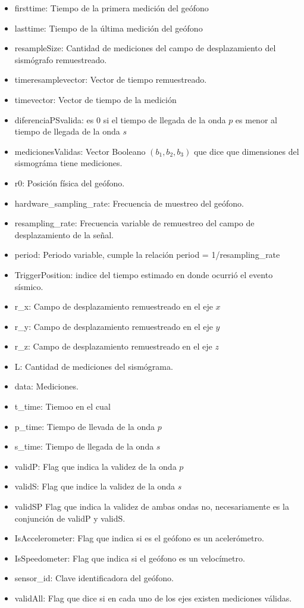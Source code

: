 \begin{itemize}
    \item firsttime: Tiempo de la primera medición del geófono
    \item lasttime: Tiempo de la última medición del geófono
    \item resampleSize: Cantidad de mediciones del campo de desplazamiento del
    sismógrafo remuestreado.
    \item timeresamplevector: Vector de tiempo remuestreado.
    \item timevector: Vector de tiempo de la medición
    \item diferenciaPSvalida: es 0 si el tiempo de llegada de la onda $p$ es
    menor al tiempo de llegada de la onda $s$
    \item medicionesValidas: Vector Booleano $(b_1,b_2,b_3)$ que dice que
    dimensiones del sismográma tiene mediciones.
    \item r0: Posición física del geófono.
    \item hardware\_sampling\_rate: Frecuencia de muestreo del geófono.
    \item resampling\_rate: Frecuencia variable de remuestreo del campo de
    desplazamiento de la señal.
    \item period: Periodo variable, cumple la relación period = 1/resampling\_rate
    \item TriggerPosition: indice del tiempo estimado en donde ocurrió el evento
    sísmico.
    \item r\_x: Campo de desplazamiento remuestreado en el eje $x$
    \item r\_y: Campo de desplazamiento remuestreado en el eje $y$
    \item r\_z: Campo de desplazamiento remuestreado en el eje $z$
    \item L: Cantidad de mediciones del sismógrama.
    \item data: Mediciones.
    \item t\_time: Tiemoo en el cual
    \item p\_time: Tiempo de llevada de la onda $p$
    \item s\_time: Tiempo de llegada de la onda $s$
    \item validP: Flag que indica la validez de la onda $p$
    \item validS: Flag que indice la validez de la onda $s$
    \item validSP Flag que indica la validez de ambas ondas no, necesariamente
    es la conjunción de validP y validS. 
    \item IsAccelerometer: Flag que indica si es el geófono es un acelerómetro. 
    \item IsSpeedometer: Flag que indica si el geófono es un velocímetro.
    \item sensor\_id: Clave identificadora del geófono.
    \item validAll: Flag que dice si en cada uno de los ejes existen mediciones
    válidas.
\end{itemize}

